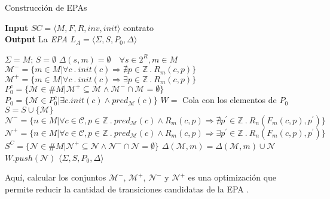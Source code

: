 \begin{algorithm}[H]
    \caption{Construcción de EPAs}
    \hspace*{\algorithmicindent} \textbf{Input} $SC = \langle M, F, R, inv, init \rangle$ contrato \\
    \hspace*{\algorithmicindent} \textbf{Output} La \textit{EPA} $L_A =\langle \Sigma, S, P_0, \Delta \rangle$
    \begin{algorithmic}[1]
        \State $\Sigma = M$; $S = \emptyset$
        \State $\Delta(s,m) = \emptyset \quad \forall s \in 2^R, m \in M$
        \State $\mathcal{M}^- = \{m \in M | \forall c \: . \: init(c) \Rightarrow \nexists p \in \mathds{Z} \: . \: R_m(c,p)\}$
        \State $\mathcal{M}^+ = \{m \in M | \forall c \: . \: init(c) \Rightarrow \exists p \in \mathds{Z} \: . \: R_m(c,p)\}$
        \State $P_0^c = \{\mathcal{M} \in \#M | \mathcal{M}^+ \subseteq \mathcal{M} \land \mathcal{M}^- \cap \mathcal{M} = \emptyset \}$
        \State $P_0 = \{\mathcal{M} \in P_0^c | \exists c . init(c) \land pred_\mathcal{M}(c) \}$
        \State $W =$ Cola con los elementos de $P_0$
        \State $S = S \cup \{\mathcal{M}\}$
        \State $\mathcal{N}^- = \{n \in M | \forall c \in \mathcal{C}, p \in \mathds{Z} \: . \: pred_\mathcal{M}(c) \land R_m(c,p) \Rightarrow \nexists p^\prime \in \mathds{Z} \: . \: R_n(F_m(c,p),p^\prime)\}$
        \State $\mathcal{N}^+ = \{n \in M | \forall c \in \mathcal{C}, p \in \mathds{Z} \: . \: pred_\mathcal{M}(c) \land R_m(c,p) \Rightarrow \exists p^\prime \in \mathds{Z} \: . \: R_n(F_m(c,p),p^\prime)\}$
        \State $S^C = \{\mathcal{N} \in \#M | \mathcal{N}^+ \subseteq \mathcal{N} \land \mathcal{N}^- \cap \mathcal{N} = \emptyset\}$
            \State $\Delta (\mathcal{M},m) = \Delta (\mathcal{M},m) \cup \mathcal{N}$
            \State $W.push(\mathcal{N})$
            \EndIf
            \EndIf
            \EndFor
            \EndFor
            \EndWhile
            \State \Return $\langle \Sigma, S, P_0, \Delta \rangle$
    \end{algorithmic}
\end{algorithm}

Aquí, calcular los conjuntos $\mathcal{M}^-$, $\mathcal{M}^+$, $\mathcal{N}^-$ y $\mathcal{N}^+$ es una optimización que permite reducir la cantidad de transiciones candidatas de la EPA \cite{de-caso-epa}.

